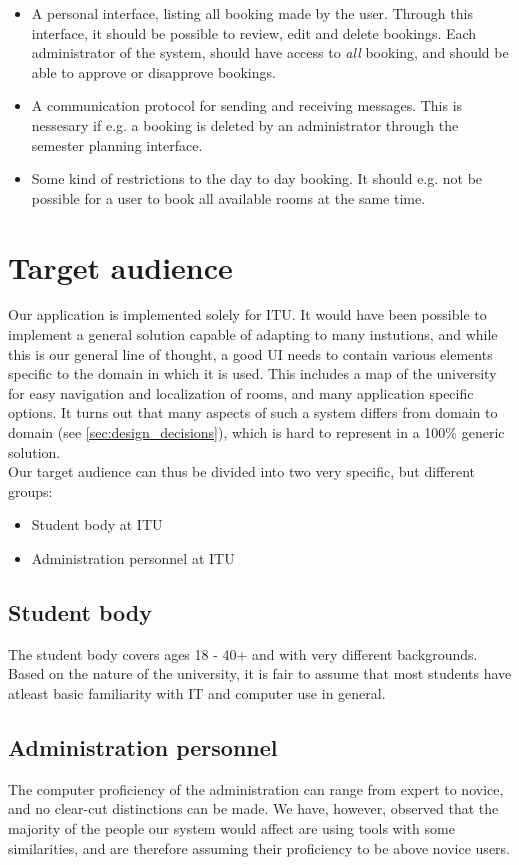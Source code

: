 \begin{itemize}
	\item A personal interface, listing all booking made by the user. Through this interface, it should be possible to review, edit and delete bookings. Each administrator of the system, should have access to \emph{all} booking, and should be able to approve or disapprove bookings.
	\item A communication protocol for sending and receiving messages. This is nessesary if e.g. a booking is deleted by an administrator through the semester planning interface.
	\item Some kind of restrictions to the day to day booking. It should e.g. not be possible for a user to book all available rooms at the same time.
\end{itemize}


\section{Target audience} %
\label{sec:target_audience}
Our application is implemented solely for ITU. It would have been possible to implement a general solution capable of adapting to many instutions, and while this is our general line of thought, a good UI needs to contain various elements specific to the domain in which it is used. This includes a map of the university for easy navigation and localization of rooms, and many application specific options. It turns out that many aspects of such a system differs from domain to domain (see \ref{sec:design_decisions}), which is hard to represent in a 100\% generic solution.\\

Our target audience can thus be divided into two very specific, but different groups:
\begin{itemize}
\item Student body at ITU
\item Administration personnel at ITU
\end{itemize}

\subsection*{Student body}
The student body covers ages 18 - 40+ and with very different backgrounds. Based on the nature of the university, it is fair to assume that most students have atleast basic familiarity with IT and computer use in general.

\subsection*{Administration personnel}
The computer proficiency of the administration can range from expert to novice, and no clear-cut distinctions can be made. We have, however, observed that the majority of the people our system would affect are using tools with some similarities, and are therefore assuming their proficiency to be above novice users.

